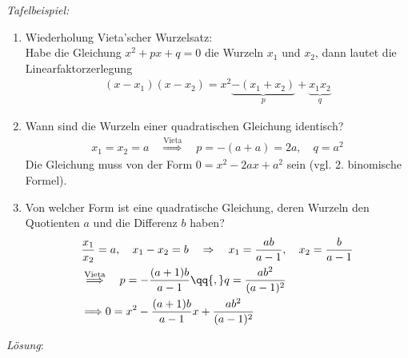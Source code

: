 \emph{Tafelbeispiel: }
\begin{enumerate}
    \item Wiederholung Vieta'scher Wurzelsatz: \\
    Habe die Gleichung $x^2+px+q=0$ die Wurzeln $x_1$ und $x_2$, dann lautet die Linearfaktorzerlegung 
    \begin{align}
        (x-x_1)(x-x_2) = x^2 \underbrace{- (x_1+x_2)}_{p} + \underbrace{x_1x_2}_{q}
    \end{align}
    \item Wann sind die Wurzeln einer quadratischen Gleichung identisch? 
    \begin{align}
        x_1 = x_2 = a \quad \overset{\text{Vieta}}{\Longrightarrow} \quad p = -(a+a) = 2a, \quad q = a^2
    \end{align}
    Die Gleichung muss von der Form $0= x^2 -2ax + a^2$ sein (vgl. 2. binomische Formel).
    \item Von welcher Form ist eine quadratische Gleichung, deren Wurzeln den Quotienten $a$ und die Differenz $b$ haben? 
    \begin{align}
        &\frac{x_1}{x_2} = a, \quad x_1 - x_2 = b \quad \Rightarrow \quad x_1 = \frac{ab}{a-1}, \quad x_2 = \frac{b}{a-1}\\
        &\overset{\text{Vieta}}{\Longrightarrow} \quad p = -\frac{(a+1)b}{a-1} \qq{,} q = \frac{ab^2}{(a-1)^2} \\
        & \Longrightarrow 0 = x^2 - \frac{(a+1)b}{a-1}x + \frac{ab^2}{(a-1)^2} 
    \end{align}
\end{enumerate}

\emph{Lösung}:

